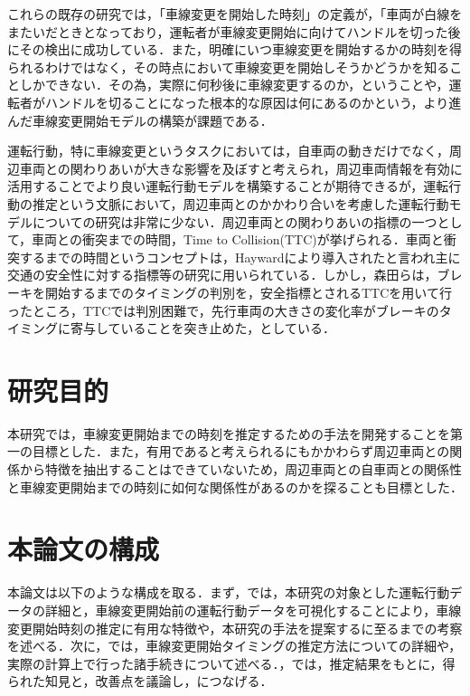 \par
これらの既存の研究では，「車線変更を開始した時刻」の定義が，「車両が白線をまたいだときとなっており，運転者が車線変更開始に向けてハンドルを切った後にその検出に成功している．また，明確にいつ車線変更を開始するかの時刻を得られるわけではなく，その時点において車線変更を開始しそうかどうかを知ることしかできない．その為，実際に何秒後に車線変更するのか，ということや，運転者がハンドルを切ることになった根本的な原因は何にあるのかという，より進んだ車線変更開始モデルの構築が課題である．
\par
運転行動，特に車線変更というタスクにおいては，自車両の動きだけでなく，周辺車両との関わりあいが大きな影響を及ぼすと考えられ，周辺車両情報を有効に活用することでより良い運転行動モデルを構築することが期待できるが，運転行動の推定という文脈において，周辺車両とのかかわり合いを考慮した運転行動モデルについての研究は非常に少ない\cite{survey}．周辺車両との関わりあいの指標の一つとして，車両との衝突までの時間，Time to Collision(TTC)が挙げられる．車両と衝突するまでの時間というコンセプトは，Hayward\cite{hayward}により導入されたと言われ主に交通の安全性に対する指標等の研究に用いられている\cite{Minderhoud}．しかし，森田\cite{Morita}らは，ブレーキを開始するまでのタイミングの判別を，安全指標とされるTTCを用いて行ったところ，TTCでは判別困難で，先行車両の大きさの変化率がブレーキのタイミングに寄与していることを突き止めた，としている．
\\
\section{研究目的}
本研究では，車線変更開始までの時刻を推定するための手法を開発することを第一の目標とした．また，有用であると考えられるにもかかわらず周辺車両との関係から特徴を抽出することはできていないため，周辺車両との自車両との関係性と車線変更開始までの時刻に如何な関係性があるのかを探ることも目標とした．
\\
\section{本論文の構成}
本論文は以下のような構成を取る．まず，では，本研究の対象とした運転行動データの詳細と，車線変更開始前の運転行動データを可視化することにより，車線変更開始時刻の推定に有用な特徴や，本研究の手法を提案するに至るまでの考察を述べる．次に，では，車線変更開始タイミングの推定方法についての詳細や，実際の計算上で行った諸手続きについて述べる．，では，推定結果をもとに，得られた知見と，改善点を議論し，につなげる．


